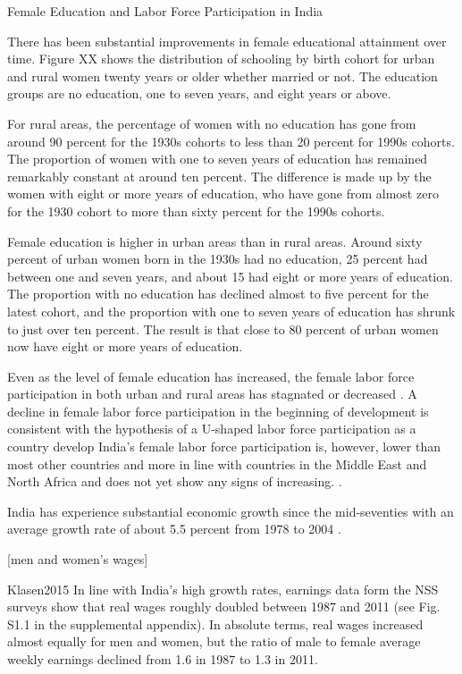 Female Education and Labor Force Participation in India

There has been substantial improvements in female educational attainment over time.
Figure XX shows the distribution of schooling by birth cohort for urban and rural women 
twenty years or older whether married or not.
The education groups are no education, one to seven years, and eight years or
above.

For rural areas, the percentage of women with no education has gone from around 90 percent
for the 1930s cohorts to less than 20 percent for 1990s cohorts. 
The proportion of women with one to seven years of education has remained remarkably
constant at around ten percent.
The difference is made up by the women with eight or more years of education, who have
gone from almost zero for the 1930 cohort to more than sixty percent for the 1990s cohorts.

Female education is higher in urban areas than in rural areas.
Around sixty percent of urban women born in the 1930s had no education, 25 percent had
between one and seven years, and about 15 had eight or more years of education.
The proportion with no education has declined almost to five percent for the latest
cohort, and the proportion with one to seven years of education has shrunk to just over
ten percent.
The result is that close to 80 percent of urban women now have eight or more years of
education.


Even as the level of female education has increased, the female labor force participation 
in both urban and rural areas has stagnated or decreased
\citep{Klasen2015,Afridi2018,Bhargava2018, Chatterjee2018, Bhargava2019}.
A decline in female labor force participation in the beginning of development is
consistent with the hypothesis of a U-shaped labor force participation as a country
develop \citep{Goldin1994}
India's female labor force participation is, however,  lower than most other
countries and more in line with countries in the Middle East and North Africa and
does not yet show any signs of increasing.
\citep{Klasen2015,Chatterjee2018}.

India has experience substantial economic growth since the mid-seventies with
an average growth rate of about 5.5 percent from 1978 to 2004 \citet{Bosworth2008}.

[men and women's wages]

Klasen2015
In line with India’s high growth rates, earnings data form the NSS
surveys show that real wages roughly doubled between 1987 and 2011 (see
Fig. S1.1 in the supplemental appendix). In absolute terms, real wages
increased almost equally for men and women, but the ratio of male to
female average weekly earnings declined from 1.6 in 1987 to 1.3 in 2011.


